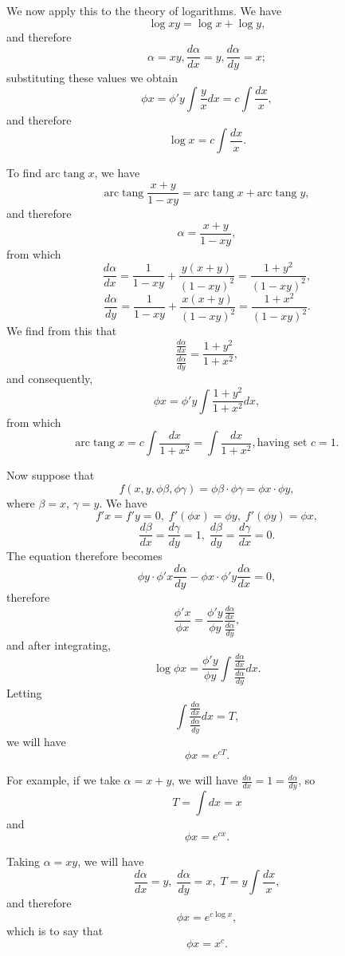 \documentclass[12pt]{article}
\begin{document}
We now apply this to the theory of logarithms.  We have 
\[ \log xy = \log x + \log y , \]
and therefore 
\[ \alpha = xy, \frac{d\alpha}{dx} = y, \frac{d\alpha}{dy} = x; \]
substituting these values we obtain 
\[ \phi x = \phi' y \int \frac{y}{x} dx = c \int \frac{dx}{x}, \]
and therefore 
\[ \log x = c \int \frac{dx}{x} .\]

To find $\mathrm{arc \; tang \;} x$, we have 
\[ \mathrm{arc \; tang \;} \frac{x+y}{1-xy} = \mathrm{arc \; tang \;} x + \mathrm{arc \; tang \;} y, \]
and therefore 
\[ \alpha = \frac{x+y}{1-xy}, \]
from which 
\[ \frac{d\alpha}{dx} = \frac{1}{1-xy} + \frac{y(x+y)}{(1-xy)^2} = \frac{1+y^2}{(1-xy)^2}, \]
\[ \frac{d\alpha}{dy} = \frac{1}{1-xy} + \frac{x(x+y)}{(1-xy)^2} = \frac{1+x^2}{(1-xy)^2}. \]
We find from this that 
\[ \frac{\frac{d\alpha}{dx}}{\frac{d\alpha}{dy}} = \frac{1+y^2}{1+x^2}, \]
and consequently,
\[ \phi x = \phi'y \int \frac{1+y^2}{1+x^2} dx , \]
from which 
\[ \mathrm{arc \; tang \;} x = c \int \frac{dx}{1+x^2} = \int \frac{dx}{1+x^2} , \textrm{having set } c = 1. \]

Now suppose that 
\[ f(x,y,\phi\beta,\phi\gamma) = \phi \beta \cdot \phi \gamma = \phi x \cdot \phi y, \]
where $\beta = x$, $\gamma = y$.  We have 
\[ f'x = f'y = 0, \; f'(\phi x ) = \phi y, \; f'(\phi y) = \phi x, \]
\[ \frac{d\beta}{dx} = \frac{d\gamma}{dy} = 1, \; \frac{d\beta}{dy} = \frac{d\gamma}{dx} = 0. \]
The equation therefore becomes
 \[ \phi y \cdot \phi'x \frac{d\alpha}{dy} - \phi x \cdot \phi' y \frac{d\alpha}{dx} = 0, \]
 therefore
 \[ \frac{\phi'x}{\phi x} = \frac{\phi'y}{\phi y} \frac{ \frac{d\alpha}{dx} }{ \frac{d\alpha}{dy} } , \]
 and after integrating, 
 \[ \log \phi x = \frac{\phi'y}{\phi y} \int \frac{\frac{d\alpha}{dx}}{\frac{d\alpha}{dy}} dx. \]
Letting
 \[ \int \frac{\frac{d\alpha}{dx}}{\frac{d\alpha}{dy}} dx = T, \]
 we will have 
 \[ \phi x = e^{c T}. \] 

For example, if we take $\alpha = x+y$, we will have $\frac{d\alpha}{dx} = 1 = \frac{d\alpha}{dy}$, so
\[ T = \int dx = x \]
and 
\[ \phi x = e^{cx}. \]

Taking $\alpha = xy$, we will have 
\[ \frac{d\alpha}{dx} = y, \; \frac{d\alpha}{dy} = x, \; T = y \int \frac{dx}{x}, \]
and therefore 
\[ \phi x = e^{c \log x} ,\]
which is to say that 
\[ \phi x = x^c. \]
\end{document}
